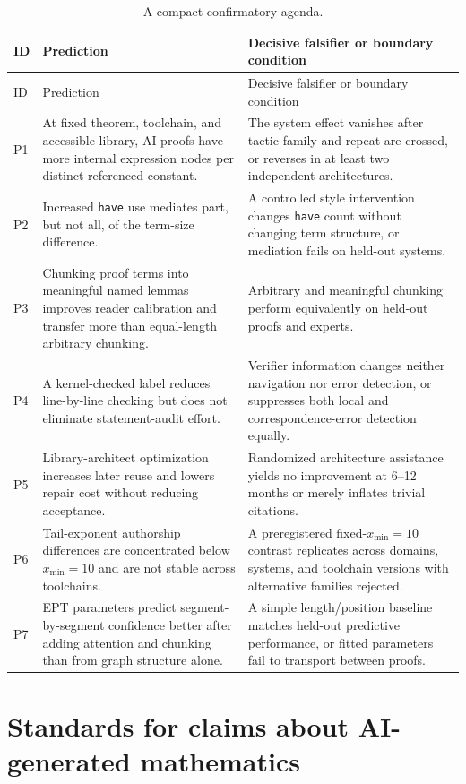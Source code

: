 \documentclass[11pt]{article}
\newcommand{\code}[1]{\texttt{#1}}
\newcommand{\xmin}{x_{\min}}
\begin{document}
\begin{longtable}{p{}p{}p{}}
\caption{A compact confirmatory agenda.}\label{tab:hypotheses}\\
\toprule
ID & Prediction & Decisive falsifier or boundary condition \\
\midrule
\endfirsthead
\toprule ID & Prediction & Decisive falsifier or boundary condition \\
\midrule
\endhead
P1 & At fixed theorem, toolchain, and accessible library, AI proofs have more internal expression
nodes per distinct referenced constant. & The system effect vanishes after tactic family and repeat
are crossed, or reverses in at least two independent architectures. \\
P2 & Increased \code{have} use mediates part, but not all, of the term-size difference. & A controlled
style intervention changes \code{have} count without changing term structure, or mediation fails on
held-out systems. \\
P3 & Chunking proof terms into meaningful named lemmas improves reader calibration and transfer more
than equal-length arbitrary chunking. & Arbitrary and meaningful chunking perform equivalently on
held-out proofs and experts. \\
P4 & A kernel-checked label reduces line-by-line checking but does not eliminate statement-audit
effort. & Verifier information changes neither navigation nor error detection, or suppresses both
local and correspondence-error detection equally. \\
P5 & Library-architect optimization increases later reuse and lowers repair cost without reducing
acceptance. & Randomized architecture assistance yields no improvement at 6--12 months or merely
inflates trivial citations. \\
P6 & Tail-exponent authorship differences are concentrated below $\xmin=10$ and are not stable across
toolchains. & A preregistered fixed-$\xmin=10$ contrast replicates across domains, systems, and
toolchain versions with alternative families rejected. \\
P7 & EPT parameters predict segment-by-segment confidence better after adding attention and chunking
than from graph structure alone. & A simple length/position baseline matches held-out predictive
performance, or fitted parameters fail to transport between proofs. \\
\bottomrule
\end{longtable}

\section{Standards for claims about AI-generated mathematics}
\end{document}
